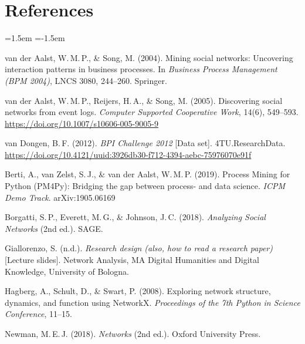 \documentclass[12pt, a4paper]{article}
\begin{document}
\section*{References}

\begin{list}{}{\leftmargin=1.5em \itemindent=-1.5em \itemsep=4pt}
\item van der Aalst, W.\,M.\,P., \& Song, M. (2004). Mining social networks: Uncovering interaction patterns in business processes. In \emph{Business Process Management (BPM 2004)}, LNCS 3080, 244--260. Springer.

\item van der Aalst, W.\,M.\,P., Reijers, H.\,A., \& Song, M. (2005). Discovering social networks from event logs. \emph{Computer Supported Cooperative Work}, 14(6), 549--593. \url{https://doi.org/10.1007/s10606-005-9005-9}

\item van Dongen, B.\,F. (2012). \emph{BPI Challenge 2012} [Data set]. 4TU.ResearchData. \url{https://doi.org/10.4121/uuid:3926db30-f712-4394-aebc-75976070e91f}
\item Berti, A., van Zelst, S.\,J., \& van der Aalst, W.\,M.\,P. (2019). Process Mining for Python (PM4Py): Bridging the gap between process- and data science. \emph{ICPM Demo Track}. arXiv:1905.06169

\item Borgatti, S.\,P., Everett, M.\,G., \& Johnson, J.\,C. (2018). \emph{Analyzing Social Networks} (2nd ed.). SAGE.

\item Giallorenzo, S. (n.d.). \emph{Research design (also, how to read a research paper)} [Lecture slides]. Network Analysis, MA Digital Humanities and Digital Knowledge, University of Bologna.

\item Hagberg, A., Schult, D., \& Swart, P. (2008). Exploring network structure, dynamics, and function using NetworkX. \emph{Proceedings of the 7th Python in Science Conference}, 11--15.

\item Newman, M.\,E.\,J. (2018). \emph{Networks} (2nd ed.). Oxford University Press.
\end{list}
\end{document}
